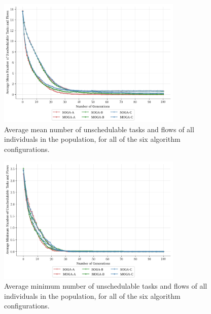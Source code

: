 \documentclass[conference]{IEEEtran}
\begin{document}
\begin{figure}[!t]
  \centering
  \includegraphics*[width=8.8cm,keepaspectratio]{img/mean_utf_1}
\vspace{-4ex}
  \caption{Average mean number of unschedulable tasks and flows of all individuals in the population, for all of the six algorithm configurations.}
  \label{fig:mean_utf_1}
\vspace{-2ex}
\end{figure}

\begin{figure}[!h]
  \centering
  \includegraphics*[width=8.8cm,keepaspectratio]{img/minimum_utf_1}
\vspace{-4ex}
  \caption{Average minimum number of unschedulable tasks and flows of all individuals in the population, for all of the six algorithm configurations.}
  \label{fig:minimum_utf_1}
\vspace{-3ex}
\end{figure}
\end{document}
